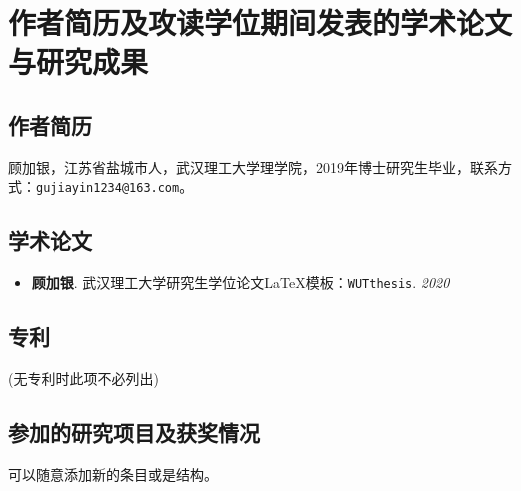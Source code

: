 \chapter{作者简历及攻读学位期间发表的学术论文与研究成果}

\section*{作者简历}

顾加银，江苏省盐城市人，武汉理工大学理学院，2019年博士研究生毕业，联系方式：\texttt{gujiayin1234@163.com}。

\section*{学术论文}



\begin{itemize}
\item \textbf{顾加银}. 武汉理工大学研究生学位论文{\LaTeX}模板：\texttt{WUTthesis}. \textit{2020}
\end{itemize}


\section*{专利}

(无专利时此项不必列出)

\section*{参加的研究项目及获奖情况}

可以随意添加新的条目或是结构。















